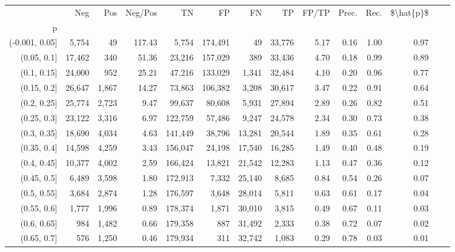 \begin{tabular}{rrrrrrrrrrrrrr}
\toprule
{} &     Neg &    Pos & Neg/Pos &       TN &       FP &      FN &      TP & FP/TP & Prec. &  Rec. & \$\textbackslash hat\{p\}\$ \\
p              &         &        &         &          &          &         &         &       &       &       &           \\
\midrule
(-0.001, 0.05] &   5,754 &     49 &  117.43 &    5,754 &  174,491 &      49 &  33,776 &  5.17 &  0.16 &  1.00 &      0.97 \\
(0.05, 0.1]    &  17,462 &    340 &   51.36 &   23,216 &  157,029 &     389 &  33,436 &  4.70 &  0.18 &  0.99 &      0.89 \\
(0.1, 0.15]    &  24,000 &    952 &   25.21 &   47,216 &  133,029 &   1,341 &  32,484 &  4.10 &  0.20 &  0.96 &      0.77 \\
(0.15, 0.2]    &  26,647 &  1,867 &   14.27 &   73,863 &  106,382 &   3,208 &  30,617 &  3.47 &  0.22 &  0.91 &      0.64 \\
(0.2, 0.25]    &  25,774 &  2,723 &    9.47 &   99,637 &   80,608 &   5,931 &  27,894 &  2.89 &  0.26 &  0.82 &      0.51 \\
(0.25, 0.3]    &  23,122 &  3,316 &    6.97 &  122,759 &   57,486 &   9,247 &  24,578 &  2.34 &  0.30 &  0.73 &      0.38 \\
(0.3, 0.35]    &  18,690 &  4,034 &    4.63 &  141,449 &   38,796 &  13,281 &  20,544 &  1.89 &  0.35 &  0.61 &      0.28 \\
(0.35, 0.4]    &  14,598 &  4,259 &    3.43 &  156,047 &   24,198 &  17,540 &  16,285 &  1.49 &  0.40 &  0.48 &      0.19 \\
(0.4, 0.45]    &  10,377 &  4,002 &    2.59 &  166,424 &   13,821 &  21,542 &  12,283 &  1.13 &  0.47 &  0.36 &      0.12 \\
(0.45, 0.5]    &   6,489 &  3,598 &    1.80 &  172,913 &    7,332 &  25,140 &   8,685 &  0.84 &  0.54 &  0.26 &      0.07 \\
(0.5, 0.55]    &   3,684 &  2,874 &    1.28 &  176,597 &    3,648 &  28,014 &   5,811 &  0.63 &  0.61 &  0.17 &      0.04 \\
(0.55, 0.6]    &   1,777 &  1,996 &    0.89 &  178,374 &    1,871 &  30,010 &   3,815 &  0.49 &  0.67 &  0.11 &      0.03 \\
(0.6, 0.65]    &     984 &  1,482 &    0.66 &  179,358 &      887 &  31,492 &   2,333 &  0.38 &  0.72 &  0.07 &      0.02 \\
(0.65, 0.7]    &     576 &  1,250 &    0.46 &  179,934 &      311 &  32,742 &   1,083 &  0.29 &  0.78 &  0.03 &      0.01 \\

\end{tabular}
